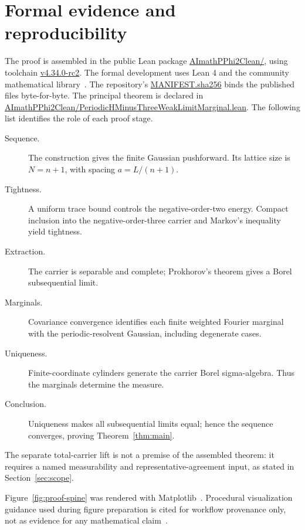 \section{Formal evidence and reproducibility}
\label{app:formal-evidence}

The proof is assembled in the public Lean package \url{AImathPPhi2Clean/}, using toolchain \url{v4.34.0-rc2}. The formal development uses Lean 4 and the community mathematical library~\cite{demoura2021,mathlib2020}. The repository's \url{MANIFEST.sha256} binds the published files byte-for-byte. The principal theorem is declared in \url{AImathPPhi2Clean/PeriodicHMinusThreeWeakLimitMarginal.lean}. The following list identifies the role of each proof stage.

\begin{description}
\item[Sequence.] The construction gives the finite Gaussian pushforward. Its lattice size is $N=n+1$, with spacing $a=L/(n+1)$.
\item[Tightness.] A uniform trace bound controls the negative-order-two energy. Compact inclusion into the negative-order-three carrier and Markov's inequality yield tightness.
\item[Extraction.] The carrier is separable and complete; Prokhorov's theorem gives a Borel subsequential limit.
\item[Marginals.] Covariance convergence identifies each finite weighted Fourier marginal with the periodic-resolvent Gaussian, including degenerate cases.
\item[Uniqueness.] Finite-coordinate cylinders generate the carrier Borel sigma-algebra. Thus the marginals determine the measure.
\item[Conclusion.] Uniqueness makes all subsequential limits equal; hence the sequence converges, proving Theorem~\ref{thm:main}.
\end{description}

The separate total-carrier lift is not a premise of the assembled theorem: it requires a named measurability and representative-agreement input, as stated in Section~\ref{sec:scope}.

Figure~\ref{fig:proof-spine} was rendered with Matplotlib~\cite{hunter2007}. Procedural visualization guidance used during figure preparation is cited for workflow provenance only, not as evidence for any mathematical claim~\cite{kassis2026}.
